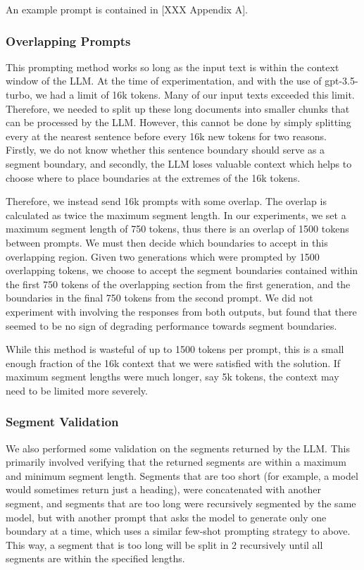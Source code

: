 An example prompt is contained in [XXX Appendix A].

\subsubsection{Overlapping Prompts}

This prompting method works so long as the input text is within the context window of the LLM. At the time of experimentation, and with the use of gpt-3.5-turbo, we had a limit of 16k tokens. Many of our input texts exceeded this limit. Therefore, we needed to split up these long documents into smaller chunks that can be processed by the LLM. However, this cannot be done by simply splitting every at the nearest sentence before every 16k new tokens for two reasons. Firstly, we do not know whether this sentence boundary should serve as a segment boundary, and secondly, the LLM loses valuable context which helps to choose where to place boundaries at the extremes of the 16k tokens.

Therefore, we instead send 16k prompts with some overlap. The overlap is calculated as twice the maximum segment length. In our experiments, we set a maximum segment length of 750 tokens, thus there is an overlap of 1500 tokens between prompts. We must then decide which boundaries to accept in this overlapping region. Given two generations which were prompted by 1500 overlapping tokens, we choose to accept the segment boundaries contained within the first 750 tokens of the overlapping section from the first generation, and the boundaries in the final 750 tokens from the second prompt. We did not experiment with involving the responses from both outputs, but found that there seemed to be no sign of degrading performance towards segment boundaries.

While this method is wasteful of up to 1500 tokens per prompt, this is a small enough fraction of the 16k context that we were satisfied with the solution. If maximum segment lengths were much longer, say 5k tokens, the context may need to be limited more severely.

\subsubsection{Segment Validation}

We also performed some validation on the segments returned by the LLM. This primarily involved verifying that the returned segments are within a maximum and minimum segment length. Segments that are too short (for example, a model would sometimes return just a heading), were concatenated with another segment, and segments that are too long were recursively segmented by the same model, but with another prompt that asks the model to generate only one boundary at a time, which uses a similar few-shot prompting strategy to above. This way, a segment that is too long will be split in 2 recursively until all segments are within the specified lengths.